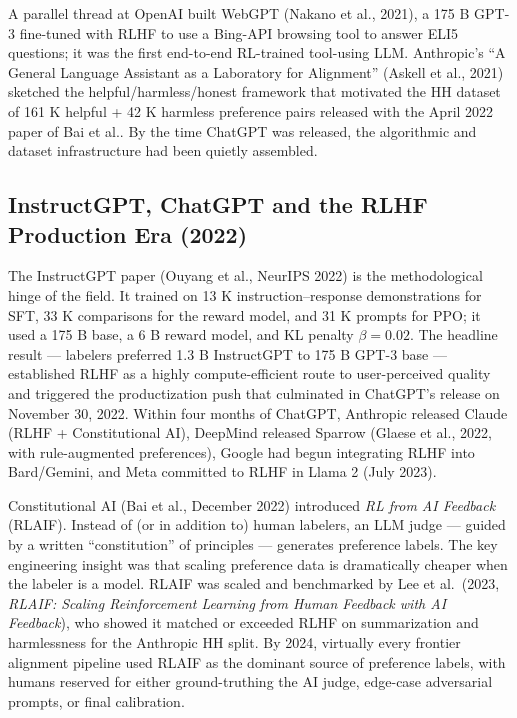 A parallel thread at OpenAI built WebGPT (Nakano et al., 2021), a 175 B GPT-3 fine-tuned with RLHF to use a Bing-API browsing tool to answer ELI5 questions; it was the first end-to-end RL-trained tool-using LLM. Anthropic's ``A General Language Assistant as a Laboratory for Alignment'' (Askell et al., 2021) sketched the helpful/harmless/honest framework that motivated the HH dataset of 161 K helpful + 42 K harmless preference pairs released with the April 2022 paper of Bai et al.. By the time ChatGPT was released, the algorithmic and dataset infrastructure had been quietly assembled.

\subsection{InstructGPT, ChatGPT and the RLHF Production Era (2022)}\label{instructgpt-chatgpt-and-the-rlhf-production-era-2022}

The InstructGPT paper (Ouyang et al., NeurIPS 2022) is the methodological hinge of the field. It trained on 13 K instruction--response demonstrations for SFT, 33 K comparisons for the reward model, and 31 K prompts for PPO; it used a 175 B base, a 6 B reward model, and KL penalty \(\beta = 0.02\). The headline result --- labelers preferred 1.3 B InstructGPT to 175 B GPT-3 base --- established RLHF as a highly compute-efficient route to user-perceived quality and triggered the productization push that culminated in ChatGPT's release on November 30, 2022. Within four months of ChatGPT, Anthropic released Claude (RLHF + Constitutional AI), DeepMind released Sparrow (Glaese et al., 2022, with rule-augmented preferences), Google had begun integrating RLHF into Bard/Gemini, and Meta committed to RLHF in Llama 2 (July 2023).

Constitutional AI (Bai et al., December 2022) introduced \emph{RL from AI Feedback} (RLAIF). Instead of (or in addition to) human labelers, an LLM judge --- guided by a written ``constitution'' of principles --- generates preference labels. The key engineering insight was that scaling preference data is dramatically cheaper when the labeler is a model. RLAIF was scaled and benchmarked by Lee et al.~(2023, \emph{RLAIF: Scaling Reinforcement Learning from Human Feedback with AI Feedback}), who showed it matched or exceeded RLHF on summarization and harmlessness for the Anthropic HH split. By 2024, virtually every frontier alignment pipeline used RLAIF as the dominant source of preference labels, with humans reserved for either ground-truthing the AI judge, edge-case adversarial prompts, or final calibration.


